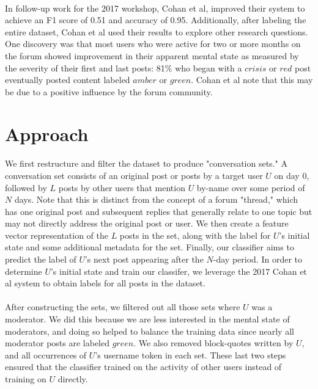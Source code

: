 \documentclass{article}
\begin{document}
\paragraph{}In follow-up work for the 2017 workshop, Cohan et al, improved their system to achieve an F1 score of 0.51 and accuracy of 0.95. Additionally, after labeling the entire dataset, Cohan et al used their results to explore other research questions. One discovery was that most users who were active for two or more months on the forum showed improvement in their apparent mental state as measured by the severity of their first and last posts: 81\% who began with a $crisis$ or $red$ post eventually posted content labeled $amber$ or $green$\cite{cohan2}. Cohan et al note that this may be due to a positive influence by the forum community.

\section{Approach}

\paragraph{}We first restructure and filter the dataset to produce "conversation sets." A conversation set consists of an original post or posts by a target user $U$ on day 0, followed by $L$ posts by other users that mention $U$ by-name over some period of $N$ days. Note that this is distinct from the concept of a forum "thread," which has one original post and subsequent replies that generally relate to one topic but may not directly address the original post or user. We then create a feature vector representation of the $L$ posts in the set, along with the label for $U$'s initial state and some additional metadata for the set. Finally, our classifier aims to predict the label of $U$'s next post appearing after the $N$-day period. In order to determine $U$'s initial state and train our classifer, we leverage the 2017 Cohan et al system to obtain labels for all posts in the dataset.

\paragraph{}After constructing the sets, we filtered out all those sets where $U$ was a moderator. We did this because we are less interested in the mental state of moderators, and doing so helped to balance the training data since nearly all moderator posts are labeled $green$. We also removed block-quotes written by $U$, and all occurrences of $U$'s username token in each set. These last two steps ensured that the classifier trained on the activity of other users instead of training on $U$ directly.
\end{document}

